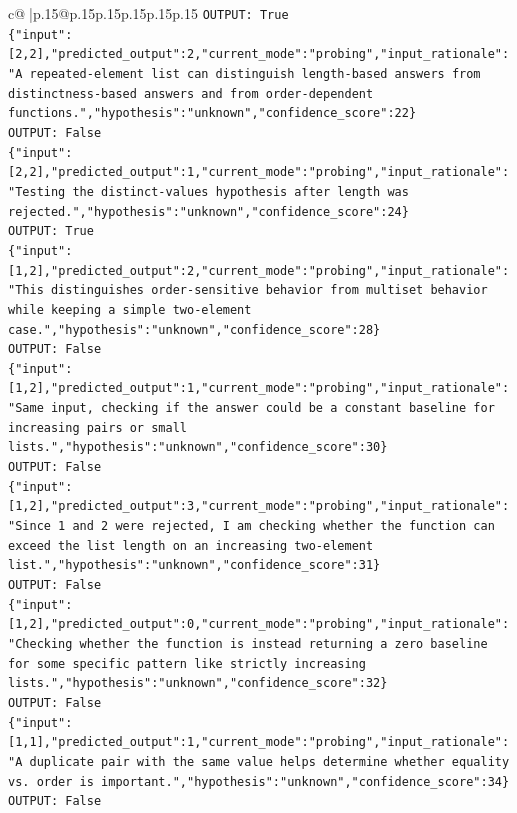 \documentclass{article}
\begin{document}
{\begin{supertabular}{c@{$\;$}|p{.15\linewidth}@{}p{.15\linewidth}p{.15\linewidth}p{.15\linewidth}p{.15\linewidth}p{.15\linewidth}}
{{{\texttt{OUTPUT: True} \\
\texttt{\{"input":{[}2,2{]},"predicted\_output":2,"current\_mode":"probing","input\_rationale":"A repeated{-}element list can distinguish length{-}based answers from distinctness{-}based answers and from order{-}dependent functions.","hypothesis":"unknown","confidence\_score":22\}} \\
\texttt{OUTPUT: False} \\
\texttt{\{"input":{[}2,2{]},"predicted\_output":1,"current\_mode":"probing","input\_rationale":"Testing the distinct{-}values hypothesis after length was rejected.","hypothesis":"unknown","confidence\_score":24\}} \\
\texttt{OUTPUT: True} \\
\texttt{\{"input":{[}1,2{]},"predicted\_output":2,"current\_mode":"probing","input\_rationale":"This distinguishes order{-}sensitive behavior from multiset behavior while keeping a simple two{-}element case.","hypothesis":"unknown","confidence\_score":28\}} \\
\texttt{OUTPUT: False} \\
\texttt{\{"input":{[}1,2{]},"predicted\_output":1,"current\_mode":"probing","input\_rationale":"Same input, checking if the answer could be a constant baseline for increasing pairs or small lists.","hypothesis":"unknown","confidence\_score":30\}} \\
\texttt{OUTPUT: False} \\
\texttt{\{"input":{[}1,2{]},"predicted\_output":3,"current\_mode":"probing","input\_rationale":"Since 1 and 2 were rejected, I am checking whether the function can exceed the list length on an increasing two{-}element list.","hypothesis":"unknown","confidence\_score":31\}} \\
\texttt{OUTPUT: False} \\
\texttt{\{"input":{[}1,2{]},"predicted\_output":0,"current\_mode":"probing","input\_rationale":"Checking whether the function is instead returning a zero baseline for some specific pattern like strictly increasing lists.","hypothesis":"unknown","confidence\_score":32\}} \\
\texttt{OUTPUT: False} \\
\texttt{\{"input":{[}1,1{]},"predicted\_output":1,"current\_mode":"probing","input\_rationale":"A duplicate pair with the same value helps determine whether equality vs. order is important.","hypothesis":"unknown","confidence\_score":34\}} \\
\texttt{OUTPUT: False} \\
}}}
\end{supertabular}}
\end{document}
